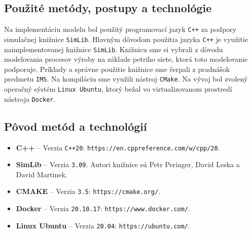 \documentclass[a4paper, 10pt]{article}
\begin{document}
        \subsection{Použité metódy, postupy a technológie}
        Na implementáciu modelu bol použitý programovací jazyk \texttt{C++} za podpory simulačnej knižnice \texttt{SimLib}.
        Hlavným dôvodom použitia jazyka \texttt{C++} je využitie naimplementovanej
        knižnice \texttt{SimLib}. Knižnicu sme si vybrali z dôvodu modelovania procesov výroby na základe petriho siete, ktorá
        toto modelovanie podporuje. Príklady a správne použitie knižnice sme čerpali z pradnášok predmetu \texttt{IMS}\cite{IMS_slides}.
        Na kompiláciu sme využili nástroj \texttt{CMake}. Na vývoj bol zvolený operačný sýstém
        \texttt{Linux Ubuntu}, ktorý bežal vo virtualizovanom prostredí nástroja \texttt{Docker}.

        \subsection{Pôvod metód a technológií}
    \begin{itemize}
        \item \textbf{C++} -- Verzia \texttt{C++20}: \texttt{https://en.cppreference.com/w/cpp/20}.
        \item \textbf{SimLib} -- Verzia \texttt{3.09}\cite{simblib}. Autori knižnice sú Petr Peringer,
        David Leska a David Martinek.
        \item \textbf{CMAKE} -- Verzia \texttt{3.5}: \texttt{https://cmake.org/}.
        \item \textbf{Docker} -- Verzia \texttt{20.10.17}: \texttt{https://www.docker.com/}.
        \item \textbf{Linux Ubuntu} -- Verzia \texttt{20.04}: \texttt{https://ubuntu.com/}.
    \end{itemize}

\end{document}
